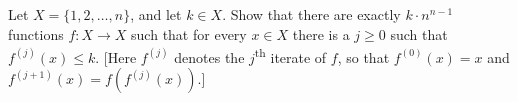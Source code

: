 Let $X = \{1, 2, \dots, n\}$, and let $k \in X$. Show that there are exactly $k \cdot n^{n-1}$ functions $f: X \to X$ such that for every $x \in X$ there is a $j \geq 0$ such that $f^{(j)}(x) \leq k$.
[Here $f^{(j)}$ denotes the $j$\textsuperscript{th} iterate of $f$, so that $f^{(0)}(x) = x$ and $f^{(j+1)}(x) = f(f^{(j)}(x))$.]
